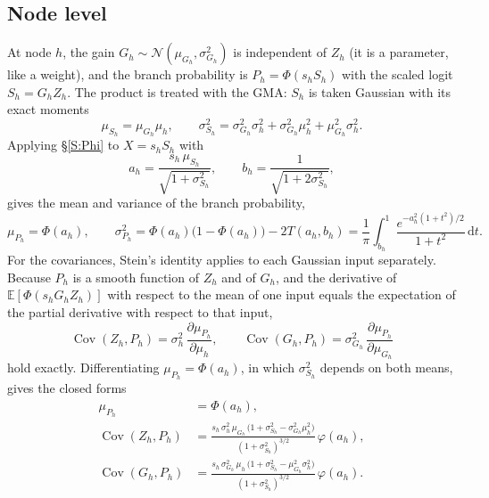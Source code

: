 \documentclass[letterpaper]{article}
\begin{document}
\subsection{Node level}
At node $h$, the gain $G_h\sim\mathcal N(\mu_{G_h},\sigma^2_{G_h})$ is independent of $Z_h$ (it is a parameter, like a weight), and the branch probability is $P_h=\Phi(s_hS_h)$ with the scaled logit $S_h=G_hZ_h$. The product is treated with the GMA: $S_h$ is taken Gaussian with its exact moments
\begin{equation}
\mu_{S_h}=\mu_{G_h}\mu_h,\qquad
\sigma^2_{S_h}=\sigma^2_{G_h}\sigma_h^2+\sigma^2_{G_h}\mu_h^2+\mu^2_{G_h}\sigma_h^2 .
\label{E:S}
\end{equation}
Applying \S\ref{S:Phi} to $X=s_hS_h$ with
\begin{equation}
a_h=\frac{s_h\,\mu_{S_h}}{\sqrt{1+\sigma^2_{S_h}}},\qquad b_h=\frac{1}{\sqrt{1+2\sigma^2_{S_h}}},
\label{E:a}
\end{equation}
gives the mean and variance of the branch probability,
\begin{equation}
\mu_{P_h}=\Phi(a_h),\qquad
\sigma^2_{P_h}=\Phi(a_h)\big(1-\Phi(a_h)\big)-2T(a_h,b_h)=\frac1\pi\int_{b_h}^{1}\frac{e^{-a_h^2(1+t^2)/2}}{1+t^2}\,\mathrm dt .
\label{E:cond}
\end{equation}
For the covariances, Stein's identity applies to each Gaussian input separately. Because $P_h$ is a smooth function of $Z_h$ and of $G_h$, and the derivative of $\mathbb E[\Phi(s_hG_hZ_h)]$ with respect to the mean of one input equals the expectation of the partial derivative with respect to that input,
\begin{equation}
\operatorname{Cov}(Z_h,P_h)=\sigma_h^2\,\frac{\partial\mu_{P_h}}{\partial\mu_h},\qquad
\operatorname{Cov}(G_h,P_h)=\sigma^2_{G_h}\,\frac{\partial\mu_{P_h}}{\partial\mu_{G_h}}
\label{E:stein}
\end{equation}
hold exactly. Differentiating $\mu_{P_h}=\Phi(a_h)$, in which $\sigma^2_{S_h}$ depends on both means, gives the closed forms
\begin{equation}
\boxed{\;
\begin{aligned}
\mu_{P_h}&=\Phi(a_h),\\
\operatorname{Cov}(Z_h,P_h)&=\frac{s_h\,\sigma_h^2\,\mu_{G_h}\,\big(1+\sigma^2_{S_h}-\sigma^2_{G_h}\mu_h^2\big)}{(1+\sigma^2_{S_h})^{3/2}}\,\varphi(a_h),\\
\operatorname{Cov}(G_h,P_h)&=\frac{s_h\,\sigma^2_{G_h}\,\mu_h\,\big(1+\sigma^2_{S_h}-\mu^2_{G_h}\sigma_h^2\big)}{(1+\sigma^2_{S_h})^{3/2}}\,\varphi(a_h).
\end{aligned}\;}
\label{E:node}
\end{equation}
\end{document}
